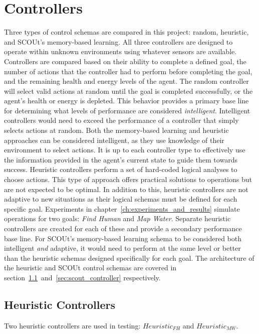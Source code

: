 
\chapter{Controllers} \label{ch:controllers}
Three types of control schemas are compared in this project: random, heuristic, and SCOUt's memory-based learning.
All three controllers are designed to operate within unknown environments using whatever sensors are available.
Controllers are compared based on their ability to complete a defined goal, the number of actions that the controller had to perform before completing the goal, and the remaining health and energy levels of the agent.
The random controller will select valid actions at random until the goal is completed successfully, or the agent's health or energy is depleted.
This behavior provides a primary base line for determining what levels of performance are considered \textit{intelligent}.
Intelligent controllers would need to exceed the performance of a controller that simply selects actions at random.
Both the memory-based learning and heuristic approaches can be considered intelligent, as they use knowledge of their environment to select actions.
It is up to each controller type to effectively use the information provided in the agent's current state to guide them towards success.
Heuristic controllers perform a set of hard-coded logical analyses to choose actions.
This type of approach offers practical solutions to operations but are not expected to be optimal.
In addition to this, heuristic controllers are not adaptive to new situations as their logical schemas must be defined for each specific goal.
Experiments in chapter~\ref{ch:experiments_and_results} simulate operations for two goals: \textit{Find Human} and \textit{Map Water}.
Separate heuristic controllers are created for each of these and provide a secondary performance base line.
For SCOUt's memory-based learning schema to be considered both intelligent \textit{and} adaptive, it would need to perform at the same level or better than the heuristic schemas designed specifically for each goal.
The architecture of the heuristic and SCOUt control schemas are covered in section~\ref{sec:heuristic_controllers}~and~\ref{sec:scout_controller} respectively.


\section{Heuristic Controllers} \label{sec:heuristic_controllers}
Two heuristic controllers are used in testing: $Heuristic_{FH}$ and $Heuristic_{MW}$.

